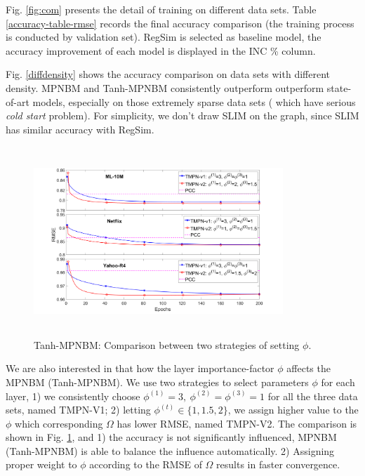 \documentclass[conference]{IEEEtran}
\begin{document}
Fig. \ref{fig:com}  presents the detail of training on different data sets. Table \ref{accuracy-table-rmse} records the final accuracy  comparison (the training process is conducted by validation set). RegSim is selected as baseline model,  the accuracy improvement of each model is displayed in the INC \% column.

Fig. \ref{diffdensity} shows the accuracy comparison on data sets with different density.  MPNBM and Tanh-MPNBM consistently outperform outperform state-of-art models, especially on those extremely sparse data sets ( which have serious \emph{cold start} problem). For simplicity, we don't draw SLIM on the graph, since SLIM has similar accuracy with RegSim.


\begin{figure}[!ht]
\hspace*{-0.4cm}
\includegraphics[height=2.8in, width=3.7in]{toyexp5}
\caption{ Tanh-MPNBM: Comparison between two strategies of setting $\phi$. }
\label{fig:toy}
\end{figure}

\vspace{0.2cm}

We are also interested in that how the layer importance-factor $\phi$ affects the MPNBM (Tanh-MPNBM). We use two strategies to select parameters $\phi$ for each layer, 1) we consistently choose $\phi^{(1)}=3,\ \phi^{(2)}=\phi^{(3)}=1$ for all the three data sets, named TMPN-V1; 2) letting $\phi^{(t)} \in \{1, 1.5, 2 \}$, we assign higher value to the $\phi$ which corresponding $\Omega$ has lower RMSE, named TMPN-V2.  The comparison is shown in Fig. \ref{fig:toy}, and 1) the accuracy is not significantly influenced, MPNBM (Tanh-MPNBM) is able to balance the influence automatically. 2) Assigning proper weight to $\phi$ according to the RMSE of $\Omega$ results in faster convergence.
\end{document}
